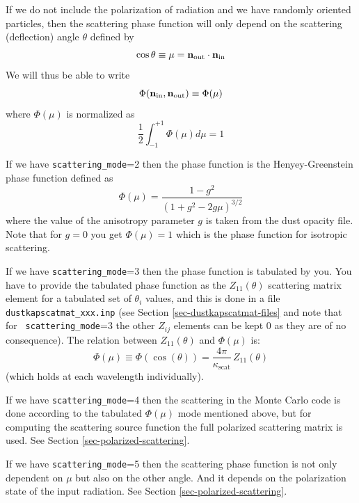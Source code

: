 \documentclass{report}
\begin{document}
If we do not include the polarization of radiation and we have randomly
oriented particles, then the scattering phase function will only depend
on the scattering (deflection) angle $\theta$ defined by
\begin{equation}
\cos\theta \equiv \mu = {\bf n}_{\mathrm{out}}\cdot {\bf n}_{\mathrm{in}}
\end{equation}
We will thus be able to write
\begin{equation}
\Phi({\bf n}_{\mathrm{in}},{\bf n}_{\mathrm{out}})
\equiv \Phi(\mu)
\end{equation}
where $\Phi(\mu)$ is normalized as
\begin{equation}
\frac{1}{2}\int_{-1}^{+1} \Phi(\mu) d\mu = 1
\end{equation}

If we have {\small\tt scattering\_mode}=2 then the phase function is
the Henyey-Greenstein phase function defined as
\begin{equation}
\Phi(\mu)=\frac{1-g^2}{(1+g^2-2g\mu)^{3/2}}
\end{equation}
where the value of the anisotropy parameter $g$ is taken from the
dust opacity file. Note that for $g=0$ you get $\Phi(\mu)=1$ which is
the phase function for isotropic scattering.

If we have {\small\tt scattering\_mode}=3 then the phase function is
tabulated by you. You have to provide the tabulated phase function as the
$Z_{11}(\theta)$ scattering matrix element for a tabulated set of $\theta_i$
values, and this is done in a file {\small\tt dustkapscatmat\_xxx.inp} (see
Section \ref{sec-dustkapscatmat-files} and note that for {\small\tt
  scattering\_mode}=3 the other $Z_{ij}$ elements can be kept 0 as they are
of no consequence). The relation between $Z_{11}(\theta)$ and 
$\Phi(\mu)$ is:
\begin{equation}
\Phi(\mu) \equiv \Phi(\cos(\theta)) = \frac{4\pi}{\kappa_{\mathrm{scat}}}\,Z_{11}(\theta)
\end{equation}
(which holds at each wavelength individually).

If we have {\small\tt scattering\_mode}=4 then the scattering in the Monte
Carlo code is done according to the tabulated $\Phi(\mu)$ mode mentioned
above, but for computing the scattering source function the full polarized
scattering matrix is used. See Section \ref{sec-polarized-scattering}.

If we have {\small\tt scattering\_mode}=5 then the scattering phase
function is not only dependent on $\mu$ but also on the other angle.
And it depends on the polarization state of the input radiation. See 
Section \ref{sec-polarized-scattering}.
\end{document}
